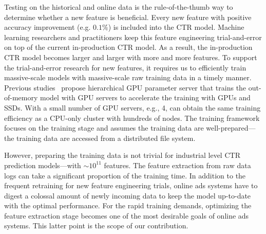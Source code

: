 \documentclass[conference]{IEEEtran}
\begin{document}
Testing on the historical and online data is the rule-of-the-thumb way to determine whether a new feature is beneficial. Every new feature with positive accuracy improvement (e.g. $0.1\%$) is included into the CTR model. Machine learning researchers and practitioners keep this feature engineering trial-and-error on top of the current in-production CTR model. As a result, the in-production CTR model becomes larger and larger with more and more features. To support the trial-and-error research for new features, it requires us to efficiently train massive-scale models with massive-scale raw training data in a timely manner. Previous studies~\cite{Proc:Zhao_MLSys20} propose hierarchical GPU parameter server that trains the out-of-memory model with GPU servers to accelerate the training with GPUs and SSDs. With a small number of GPU servers, e.g., 4, can obtain the same training efficiency as a CPU-only cluster with hundreds of nodes. The training framework focuses on the training stage and assumes the training data are well-prepared---the training data are accessed from a distributed file system.

However, preparing the training data is not trivial for industrial level CTR prediction models---with $\sim$$10^{11}$ features. The feature extraction from raw data logs can take a significant proportion of the training time. In addition to the frequent retraining for new feature engineering trials, online ads systems have to digest a colossal amount of newly incoming data to keep the model up-to-date with the optimal performance. For the rapid training demands, optimizing the feature extraction stage becomes one of the most desirable goals of online ads systems.
This latter point is the scope of our contribution.


\end{document}
